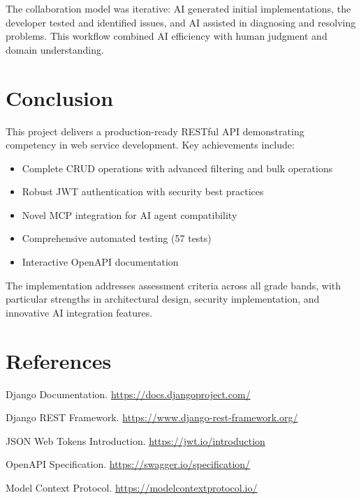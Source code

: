 \documentclass[11pt,a4paper]{article}
\begin{document}
The collaboration model was iterative: AI generated initial implementations, the developer tested and identified issues, and AI assisted in diagnosing and resolving problems. This workflow combined AI efficiency with human judgment and domain understanding.

\section{Conclusion}

This project delivers a production-ready RESTful API demonstrating competency in web service development. Key achievements include:

\begin{itemize}[noitemsep]
    \item Complete CRUD operations with advanced filtering and bulk operations
    \item Robust JWT authentication with security best practices
    \item Novel MCP integration for AI agent compatibility
    \item Comprehensive automated testing (57 tests)
    \item Interactive OpenAPI documentation
\end{itemize}

The implementation addresses assessment criteria across all grade bands, with particular strengths in architectural design, security implementation, and innovative AI integration features.

\section*{References}

\begin{enumerate}[noitemsep, label={[\arabic*]}]
    \item Django Documentation. \url{https://docs.djangoproject.com/}
    \item Django REST Framework. \url{https://www.django-rest-framework.org/}
    \item JSON Web Tokens Introduction. \url{https://jwt.io/introduction}
    \item OpenAPI Specification. \url{https://swagger.io/specification/}
    \item Model Context Protocol. \url{https://modelcontextprotocol.io/}
\end{enumerate}
\end{document}
